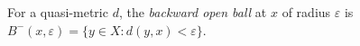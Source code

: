 
For a quasi-metric $d$, the \emph{backward open ball} at $x$ of radius $\varepsilon$ is $B^-(x,\varepsilon)=\{y\in X:d(y,x)<\varepsilon\}$.
